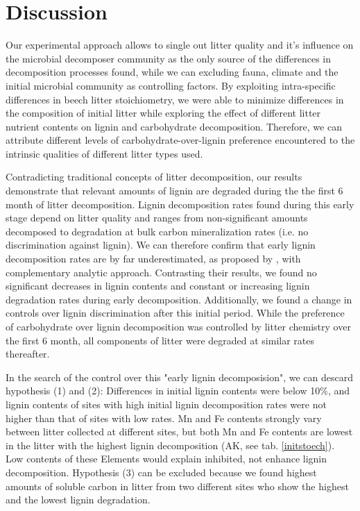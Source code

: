 \documentclass[authoryear,preprint,review,12pt]{elsarticle}
\begin{document}
\section{Discussion}

Our experimental approach allows to single out litter quality and it's influence on the microbial decomposer community as the only source of the differences in decomposition processes found, while we can excluding fauna, climate and the initial microbial community as controlling factors. By exploiting intra-specific differences in beech litter stoichiometry, we were able to minimize differences in the composition of initial litter while exploring the effect of different litter nutrient contents on lignin and carbohydrate decomposition. Therefore, we can attribute different levels of carbohydrate-over-lignin preference encountered to the intrinsic qualities of different litter types used.

Contradicting traditional concepts of litter decomposition, our results demonstrate that relevant amounts of lignin are degraded during the the first 6 month of litter decomposition. Lignin decomposition rates found during this early stage depend on litter quality and ranges from non-significant amounts decomposed to degradation at bulk carbon mineralization rates (i.e. no discrimination against lignin). We can therefore confirm that early lignin decomposition rates are by far underestimated, as proposed by \cite{Klotzbucher2011}, with complementary analytic approach. Contrasting their results, we found no significant decreases in lignin contents and constant or increasing lignin degradation rates during early decomposition. Additionally, we found a change in controls over lignin discrimination after this initial period. While the preference of carbohydrate over lignin decomposition was controlled by litter chemistry over the first 6 month, all components of litter were degraded at similar rates thereafter.

In the search of the control over this "early lignin decomposision", we can descard hypothesis (1) and (2): Differences in initial lignin contents were below 10\%, and lignin contents of sites with high initial lignin decomposition rates were not higher than that of sites with low rates. Mn and Fe contents strongly vary between litter collected at different sites, but both Mn and Fe contents are lowest in the litter with the highest lignin decomposition (AK, see tab. \ref{initstoech}). Low contents of these Elements would explain inhibited, not enhance lignin decomposition. Hypothesis (3) can be excluded because we found highest amounts of soluble carbon in litter from two different sites who show the highest and the lowest lignin degradation.
\end{document}
